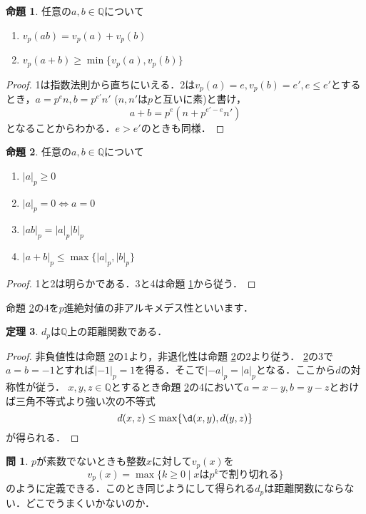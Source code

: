 \documentclass[uplatex]{jsarticle}
\newcommand{\Q}{\mathbb{Q}}
\theoremstyle{definition} %
\newtheorem{thm}{定理}
\newtheorem{prop}[thm]{命題}
\newtheorem*{exercise*}{問}
\begin{document}
\begin{oframed}\begin{prop}\label{prop:1}
任意の$a, b \in \Q$について
\begin{enumerate}
\item $v_p(ab) = v_p(a) + v_p(b)$
\item $v_p(a+b) \geq \min\{v_p(a), v_p(b)\}$
\end{enumerate}
\end{prop}\end{oframed}
\begin{proof}
1は指数法則から直ちにいえる．2は$v_p(a) = e, v_p(b) = e', e \leq e'$とするとき，$a = p^e n, b = p^{e'} n'$ ($n, n'$は$p$と互いに素)と書け，
\[a + b = p^e(n + p^{e'-e} n')\]
となることからわかる．$e > e'$のときも同様．
\end{proof}

\begin{oframed}\begin{prop}\label{prop:2}
任意の$a, b \in \Q$について
\begin{enumerate}
\item $|a|_p \geq 0$
\item $|a|_p = 0 \iff a = 0$
\item $|ab|_p = |a|_p |b|_p$
\item $|a+b|_p \leq \max\{|a|_p, |b|_p\}$
\end{enumerate}
\end{prop}\end{oframed}
\begin{proof}
1と2は明らかである．3と4は命題 \ref{prop:1}から従う．
\end{proof}

命題 \ref{prop:2}の4を$p$進絶対値の非アルキメデス性といいます．

\begin{oframed}\begin{thm}
$d_p$は$\Q$上の距離関数である．
\end{thm}\end{oframed}
\begin{proof}
非負値性は命題 \ref{prop:2}の1より，非退化性は命題 \ref{prop:2}の2より従う．
\ref{prop:2}の3で$a=b=-1$とすれば$|-1|_p = 1$を得る．そこで$|-a|_p = |a|_p$となる．ここから$d$の対称性が従う．
$x, y, z \in \Q$とするとき命題 \ref{prop:2}の4において$a = x - y, b = y - z$とおけば三角不等式より強い次の不等式
\[d(x, z) \leq \max\{\d(x, y), d(y, z)\} \]
が得られる．
\end{proof}

\begin{exercise*}
$p$が素数でないときも整数$x$に対して$v_p(x)$を
\[v_p(x) = \max\{k\geq0\mid xはp^kで割り切れる \}\]
のように定義できる．このとき同じようにして得られる$d_p$は距離関数にならない．どこでうまくいかないのか．
\end{exercise*}
\end{document}
